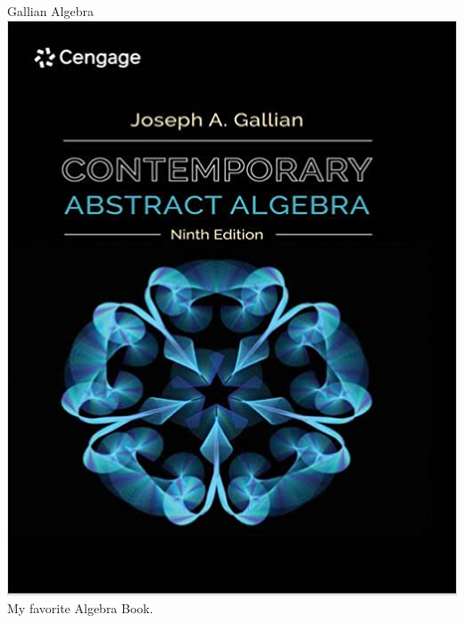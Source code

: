 \begin{boxResource}[lefthand width=5cm, sidebyside]{Gallian Algebra}
\includegraphics[width=\textwidth]{./img/Gallian_Algebra}
\tcblower
My favorite Algebra Book.
\end{boxResource}
%
